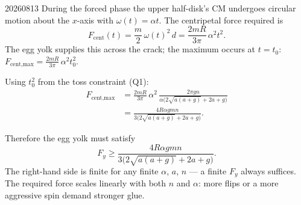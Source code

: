 \begin{solution}{20260813}
During the forced phase the upper half-disk's CM undergoes circular motion about the $x$-axis with $\omega(t) = \alpha t$.  The centripetal force required is
\[
F_{\text{cent}}(t) = \frac{m}{2}\,\omega(t)^2\,d
                   = \frac{2mR}{3\pi}\,\alpha^2 t^2.
\]
The egg yolk supplies this across the crack; the maximum occurs at $t = t_0$: $F_{\text{cent,max}} = \frac{2mR}{3\pi}\,\alpha^2 t_0^2$.

Using $t_0^2$ from the toss constraint (Q1):
\begin{align*}
F_{\text{cent,max}}
  &= \frac{2mR}{3\pi}\,\alpha^2\,
     \frac{2\pi g n}{\alpha\bigl(2\sqrt{a(a+g)} + 2a + g\bigr)} \\[4pt]
  &= \frac{4 R \alpha g m n}{3\bigl(2\sqrt{a(a+g)} + 2a + g\bigr)}.
\end{align*}

Therefore the egg yolk must satisfy
\[
\boxed{F_y \ge \frac{4R\alpha g m n}{3\bigl(2\sqrt{a(a+g)} + 2a + g\bigr)}}.
\]
The right-hand side is finite for any finite $\alpha$, $a$, $n$ --- a finite $F_y$ always suffices.  The required force scales linearly with both $n$ and $\alpha$: more flips or a more aggressive spin demand stronger glue.

\end{solution}

